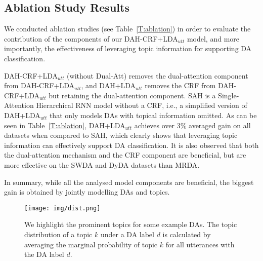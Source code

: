 \documentclass[11pt,a4paper]{article}
\begin{document}
\begin{table}[tb] 
  \caption{Ablation studies of DA classification.}
  \label{T:ablation}
\end{table}

\subsection{Ablation Study Results}
We conducted ablation studies (see Table~\ref{T:ablation}) in order to evaluate the contribution of the components of our DAH-CRF+LDA$_{utt}$ model, and more importantly, the effectiveness of leveraging topic information for supporting DA classification.

DAH-CRF+LDA$_{utt}$ (without Dual-Att) removes the dual-attention component from DAH-CRF+LDA$_{utt}$, and   DAH+LDA$_{utt}$ removes the CRF from DAH-CRF+LDA$_{utt}$ but retaining the dual-attention component. SAH is a Single-Attention Hierarchical RNN model without a CRF, i.e., a simplified version of DAH+LDA$_{utt}$ that only models DAs with topical information omitted. As can be seen in Table~\ref{T:ablation},  DAH+LDA$_{utt}$ achieves over 3\% averaged gain on all datasets when compared to SAH, which clearly shows that leveraging topic information can effectively support DA classification. It is also observed that both the dual-attention mechanism and the CRF component are beneficial, but are more effective on the SWDA and DyDA datasets than MRDA.

In summary, while all the analysed model components are beneficial, the biggest   gain is obtained by jointly modelling DAs and topics. 
 

\begin{figure}[tb]
  \centering
  \texttt{[image: img/dist.png]}
  \caption{We highlight the prominent topics for some example DAs. The topic distribution of a topic $k$ under a DA label $d$ is calculated by averaging the marginal probability of topic $k$ for all utterances with the DA label $d$.}
  \label{fig:swda_dyda_topic_dist}
\end{figure}
\end{document}
